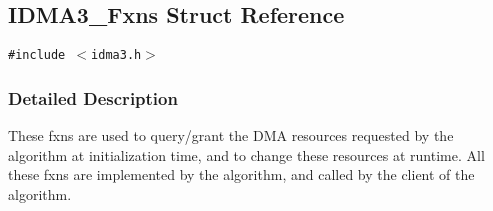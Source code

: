 \hypertarget{struct_i_d_m_a3___fxns}{
\subsection{IDMA3\_\-Fxns Struct Reference}
\label{struct_i_d_m_a3___fxns}
}
{\tt \#include $<$idma3.h$>$}



\subsubsection{Detailed Description}
These fxns are used to query/grant the DMA resources requested by the algorithm at initialization time, and to change these resources at runtime. All these fxns are implemented by the algorithm, and called by the client of the algorithm. 



